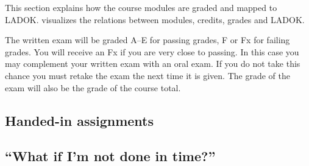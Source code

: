 
This section explains how the course modules are graded and mapped to LADOK\@.
 visualizes the relations between modules, credits, grades and 
LADOK\@.

\begin{frame}
  
\end{frame}

The written exam will be graded A--E for passing grades, F or Fx for failing 
grades.
You will receive an Fx if you are very close to passing.
In this case you may complement your written exam with an oral exam.
If you do not take this chance you must retake the exam the next 
time it is given.
The grade of the exam will also be the grade of the course total.

\subsection{Handed-in assignments}


\subsection{\enquote{What if I'm not done in time?}}%
\label{sec:late}



\printbibliography{}
